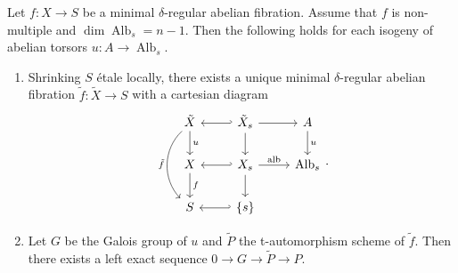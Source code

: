 \documentclass[reqno, letterpaper]{amsart}
\numberwithin{equation}{subsection}
\let\to\longrightarrow
\DeclareMathOperator{\Alb}{Alb}
\DeclareMathOperator{\alb}{alb}
\begin{document}
		\begin{lemma} \label{lem:untangle primitive}
			Let $f : X \to S$ be a minimal $\delta$-regular abelian fibration. Assume that $f$ is non-multiple and $\dim \Alb_s = n-1$. Then the following holds for each isogeny of abelian torsors $u : A \to \Alb_s$.
			\begin{enumerate}
				\item Shrinking $S$ \'etale locally, there exists a unique minimal $\delta$-regular abelian fibration $\tilde f : \tilde X \to S$ with a cartesian diagram
				\[\begin{tikzcd}
					\tilde X \arrow[d, "u"] \arrow[dd, bend right=45, "\tilde f"'] & \tilde X_s \arrow[r] \arrow[l, hook'] \arrow[d] & A \arrow[d, "u"] \\
					X \arrow[d, "f"] & X_s \arrow[r, "\alb"] \arrow[l, hook'] \arrow[d] & \Alb_s \\
					S & \{ s \} \arrow[l, hook']
				\end{tikzcd}.\]
				
				\item Let $G$ be the Galois group of $u$ and $\tilde P$ the t-automorphism scheme of $\tilde f$. Then there exists a left exact sequence $0 \to G \to \tilde P \to P$.
			\end{enumerate}
		\end{lemma}
\end{document}
